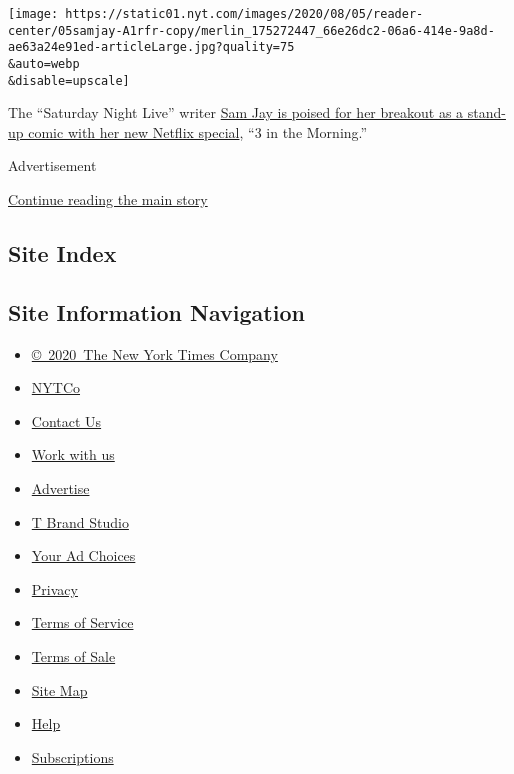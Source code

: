\texttt{[image: https://static01.nyt.com/images/2020/08/05/reader-center/05samjay-A1rfr-copy/merlin\_175272447\_66e26dc2-06a6-414e-9a8d-ae63a24e91ed-articleLarge.jpg?quality=75\\\&auto=webp\\\&disable=upscale]}

The ``Saturday Night Live'' writer
\href{https://www.nytimes.com/2020/08/04/arts/television/sam-jay-netflix-special.html}{Sam
Jay is poised for her breakout as a stand-up comic with her new Netflix
special}, ``3 in the Morning.''

Advertisement

\protect\hyperlink{after-bottom}{Continue reading the main story}

\hypertarget{site-index}{%
\subsection{Site Index}\label{site-index}}

\hypertarget{site-information-navigation}{%
\subsection{Site Information
Navigation}\label{site-information-navigation}}

\begin{itemize}
\tightlist
\item
  \href{https://help.nytimes.com/hc/en-us/articles/115014792127-Copyright-notice}{©~2020~The
  New York Times Company}
\end{itemize}

\begin{itemize}
\tightlist
\item
  \href{https://www.nytco.com/}{NYTCo}
\item
  \href{https://help.nytimes.com/hc/en-us/articles/115015385887-Contact-Us}{Contact
  Us}
\item
  \href{https://www.nytco.com/careers/}{Work with us}
\item
  \href{https://nytmediakit.com/}{Advertise}
\item
  \href{http://www.tbrandstudio.com/}{T Brand Studio}
\item
  \href{https://www.nytimes.com/privacy/cookie-policy\#how-do-i-manage-trackers}{Your
  Ad Choices}
\item
  \href{https://www.nytimes.com/privacy}{Privacy}
\item
  \href{https://help.nytimes.com/hc/en-us/articles/115014893428-Terms-of-service}{Terms
  of Service}
\item
  \href{https://help.nytimes.com/hc/en-us/articles/115014893968-Terms-of-sale}{Terms
  of Sale}
\item
  \href{https://spiderbites.nytimes.com}{Site Map}
\item
  \href{https://help.nytimes.com/hc/en-us}{Help}
\item
  \href{https://www.nytimes.com/subscription?campaignId=37WXW}{Subscriptions}
\end{itemize}
